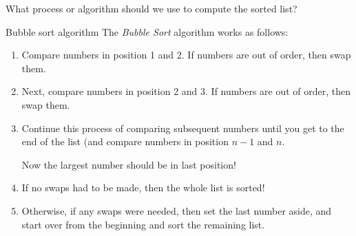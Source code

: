 What process or algorithm should we use to compute the sorted list?

\begin{general}{Bubble sort algorithm}{}
The \emph{Bubble Sort} algorithm works as follows:
\begin{enumerate}
\item Compare numbers in position 1 and 2.  If numbers are out of order, then swap them.
\item Next, compare numbers in position 2 and 3.  If numbers are out of order, then swap them.
\item Continue this process of comparing subsequent numbers until you get to the end of the list (and compare numbers in position $n-1$ and $n$.

Now the largest number should be in last position!
\item If no swaps had to be made, then the whole list is sorted!
\item Otherwise, if any swaps were needed, then set the last number aside, and start over from the beginning and sort the remaining list.
\end{enumerate}
\end{general}

